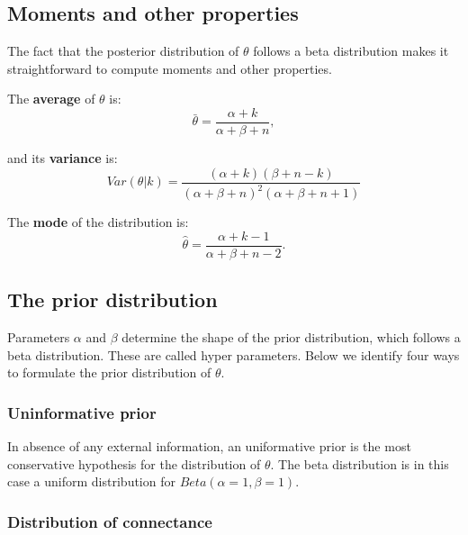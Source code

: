 \documentclass[12pt]{article}
\begin{document}
  \subsection*{Moments and other properties}

  The fact that the posterior distribution of $\theta$ follows a beta distribution makes it straightforward to compute moments and other properties. 

  The \textbf{average} of $\theta$ is: 
      \begin{equation}
        \bar{\theta} = \frac{\alpha+k}{\alpha+\beta+n} ,
        \label{mean}
      \end{equation}

    and its \textbf{variance} is:  
      \begin{equation}
        Var(\theta|k) = \frac{(\alpha + k)(\beta + n - k)}{(\alpha + \beta + n)^{2}(\alpha + \beta + n +1)}
        \label{variance}
      \end{equation}

    The \textbf{mode} of the distribution is:
      \begin{equation}
        \hat{\theta} = \frac{\alpha + k - 1}{\alpha + \beta + n - 2} .
        \label{mode}
      \end{equation}

  \subsection*{The prior distribution}    
  Parameters $\alpha$ and $\beta$ determine the shape of the prior distribution, which follows a beta distribution. These are called hyper parameters. Below we identify four ways to formulate the prior distribution of $\theta$. 

    \subsubsection*{Uninformative prior}
      
      In absence of any external information, an uniformative prior is the most conservative 
      hypothesis for the distribution of $\theta$. The beta distribution is in this case 
      a uniform distribution  for $Beta(\alpha=1,\beta=1)$. 

    \subsubsection*{Distribution of connectance}
      
\end{document}
